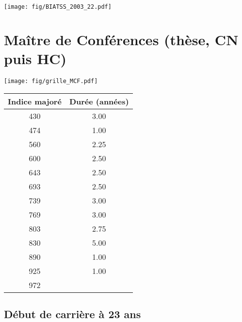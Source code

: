  \vspace{0.1cm} 

 \begin{center}\texttt{[image: fig/BIATSS\_2003\_22.pdf]}\end{center} \label{fig/BIATSS_2003_22.pdf} 

\newpage 
 
\chapter{Maître de Conférences (thèse, CN puis HC)} 

\begin{minipage}{0.55\linewidth}\texttt{[image: fig/grille\_MCF.pdf]}\end{minipage} 
\begin{minipage}{0.3\linewidth} 
 \begin{center} 

\begin{tabular}[htb]{|c|c|} 
\hline 
 Indice majoré &  Durée (années) \\ 
\hline \hline 
 430 &  3.00 \\ 
\hline 
 474 &  1.00 \\ 
\hline 
 560 &  2.25 \\ 
\hline 
 600 &  2.50 \\ 
\hline 
 643 &  2.50 \\ 
\hline 
 693 &  2.50 \\ 
\hline 
 739 &  3.00 \\ 
\hline 
 769 &  3.00 \\ 
\hline 
 803 &  2.75 \\ 
\hline 
 830 &  5.00 \\ 
\hline 
 890 &  1.00 \\ 
\hline 
 925 &  1.00 \\ 
\hline 
 972 &   \\ 
\hline 
\hline 
\end{tabular} 
\end{center} 
 \end{minipage} 


 \addto{\captionsenglish}{ \renewcommand{\mtctitle}{}} \setcounter{minitocdepth}{2} 
 \minitoc \newpage 

\section{Début de carrière à 23 ans} 

